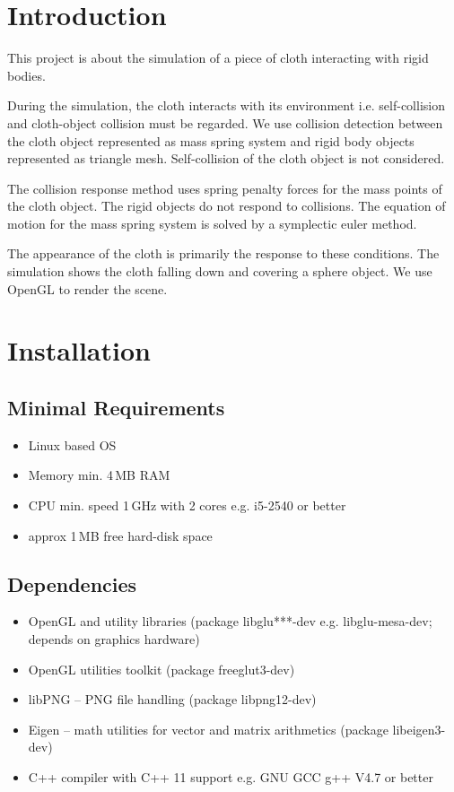 \section{Introduction}
This project is about the simulation of a piece of cloth interacting with rigid bodies.\par

During the simulation, the cloth interacts with its environment i.e. self-collision and cloth-object collision must be regarded. We use collision detection between the cloth object represented as mass spring system and rigid body objects represented as triangle mesh. Self-collision of the cloth object is not considered.\par

The collision response method uses spring penalty forces for the mass points of the cloth object. The rigid objects do not respond to collisions. The equation of motion for the mass spring system is solved by a symplectic euler method.\par

The appearance of the cloth is primarily the response to these conditions. The simulation shows the cloth falling down and covering a sphere object. We use OpenGL to render the scene.

\section{Installation}
\subsection{Minimal Requirements}
\begin{itemize}
	\item Linux based OS
	\item Memory min. 4\,MB RAM
	\item CPU min. speed 1\,GHz with 2 cores e.g. i5-2540 or better
	\item approx 1\,MB free hard-disk space
\end{itemize}
\subsection{Dependencies}
\begin{itemize}
	\item OpenGL and utility libraries (package libglu***-dev e.g. libglu-mesa-dev; depends on graphics hardware)
	\item OpenGL utilities toolkit (package freeglut3-dev)
	\item libPNG  -- PNG file handling (package libpng12-dev)
	\item Eigen -- math utilities for vector and matrix arithmetics (package libeigen3-dev)
	\item C++ compiler with C++ 11 support e.g. GNU GCC g++ V4.7 or better
\end{itemize}
